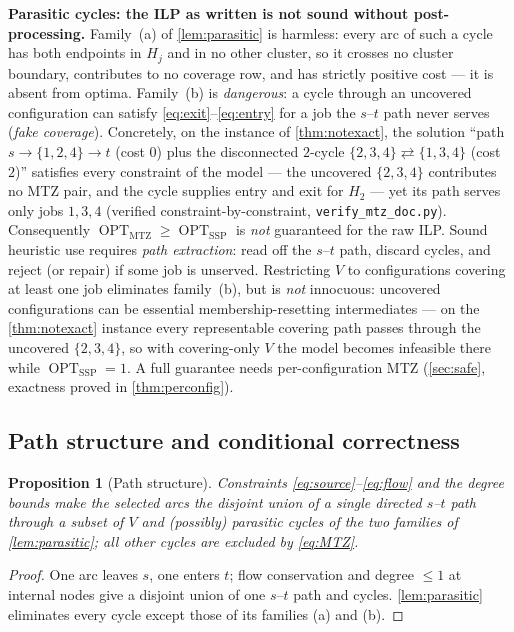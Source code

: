 \documentclass[11pt,a4paper]{article}
\theoremstyle{plain}
\newtheorem{proposition}[theorem]{Proposition}
\theoremstyle{definition}
\DeclareMathOperator{\OPT}{OPT}
\newcommand{\OMTZ}{\OPT_{\mathrm{MTZ}}}
\newcommand{\OSSP}{\OPT_{\mathrm{SSP}}}
\begin{document}
\begin{warnbox}
	\textbf{Parasitic cycles: the ILP as written is not sound without post-processing.}
	Family~(a) of \cref{lem:parasitic} is harmless: every arc of such a cycle has both
	endpoints in $H_j$ and in no other cluster, so it crosses no cluster boundary,
	contributes to no coverage row, and has strictly positive cost --- it is absent from
	optima. Family~(b) is \emph{dangerous}: a cycle through an uncovered configuration can
	satisfy \eqref{eq:exit}--\eqref{eq:entry} for a job the $s$--$t$ path never serves
	(\emph{fake coverage}). Concretely, on the instance of \cref{thm:notexact}, the solution
	``path $s\to\{1,2,4\}\to t$ (cost $0$) plus the disconnected $2$-cycle
	$\{2,3,4\}\rightleftarrows\{1,3,4\}$ (cost $2$)'' satisfies every constraint of the
	model --- the uncovered $\{2,3,4\}$ contributes no MTZ pair, and the cycle supplies
	entry and exit for $H_2$ --- yet its path serves only jobs $1,3,4$
	(verified constraint-by-constraint, \texttt{verify\_mtz\_doc.py}). Consequently
	$\OMTZ\ge\OSSP$ is \emph{not} guaranteed for the raw ILP. Sound heuristic use requires
	\emph{path extraction}: read off the $s$--$t$ path, discard cycles, and reject (or
	repair) if some job is unserved. Restricting $V$ to configurations covering at least one
	job eliminates family~(b), but is \emph{not} innocuous: uncovered configurations can be
	essential membership-resetting intermediates --- on the \cref{thm:notexact} instance
	every representable covering path passes through the uncovered $\{2,3,4\}$, so with
	covering-only $V$ the model becomes infeasible there while $\OSSP=1$. A full guarantee
	needs per-configuration MTZ (\cref{sec:safe}, exactness proved in \cref{thm:perconfig}).
\end{warnbox}

\subsection{Path structure and conditional correctness}

\begin{thmbox}
	\begin{proposition}[Path structure]
		\label{prop:path}
		Constraints \eqref{eq:source}--\eqref{eq:flow} and the degree bounds make the selected
		arcs the disjoint union of a single directed $s$--$t$ path through a subset of $V$ and
		(possibly) parasitic cycles of the two families of \cref{lem:parasitic}; all other
		cycles are excluded by \eqref{eq:MTZ}.
	\end{proposition}
\end{thmbox}
\begin{proofbox}
	\begin{proof}
		One arc leaves $s$, one enters $t$; flow conservation and degree $\le1$ at internal
		nodes give a disjoint union of one $s$--$t$ path and cycles. \cref{lem:parasitic}
		eliminates every cycle except those of its families (a) and (b).
	\end{proof}
\end{proofbox}
\end{document}
